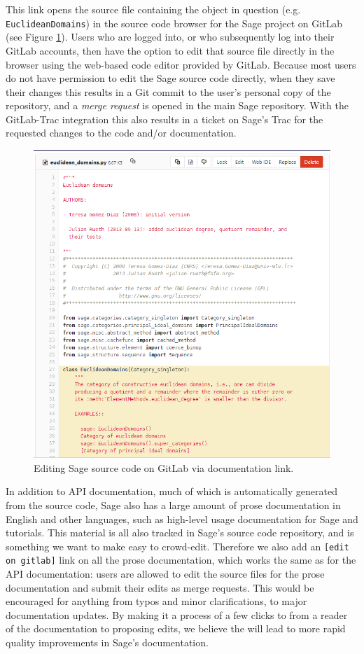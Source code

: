 {This link opens the source file containing the object in question (e.g.~{\tt
EuclideanDomains}) in the source code browser for the Sage project on GitLab
(see Figure \ref{fig:edit-on-gitlab}).  Users who are logged into, or who
subsequently log into their GitLab accounts, then have the option to edit that
source file directly in the browser using the web-based code editor provided by
GitLab.  Because most users do not have permission to edit the Sage source code
directly, when they save their changes this results in a Git commit to the
user's personal copy of the repository, and a {\em merge request} is opened in
the main Sage repository.  With the GitLab-Trac integration this also results
in a ticket on Sage's Trac for the requested changes to the code and/or
documentation.

\begin{figure}[!ht]
    \centering
    \includegraphics[width=\textwidth]{screenshots/edit-on-gitlab}
    \caption{Editing Sage source code on GitLab via documentation link.}
    \label{fig:edit-on-gitlab}
\end{figure}

In addition to API documentation, much of which is automatically generated from
the source code, Sage also has a large amount of prose documentation in English
and other languages, such as high-level usage documentation for Sage and
tutorials.  This material is all also tracked in Sage's source code repository,
and is something we want to make easy to crowd-edit.  Therefore we also add an
{\tt [edit on gitlab]} link on all the prose documentation, which works the
same as for the API documentation: users are allowed to edit the source files
for the prose documentation and submit their edits as merge requests.  This
would be encouraged for anything from typos and minor clarifications, to
major documentation updates.  By making it a process of a few clicks to from
a reader of the documentation to proposing edits, we believe the will lead
to more rapid quality improvements in Sage's documentation.


}
